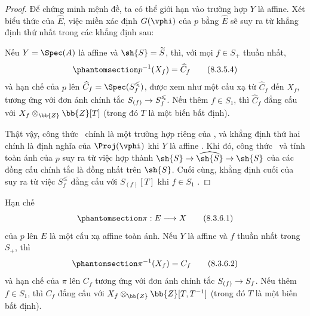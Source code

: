 \documentclass[oneside,10pt]{amsart}
\makeatletter
\renewcommand{\leq}{\leqslant}
\newcommand{\ega@arrow}[2]{\mathchoice{#1}{#2}{#2}{#2}}
\renewcommand{\to}{\ega@arrow{\longrightarrow}{\rightarrow}}
\let\EGAOriginalLabel\label
\renewcommand{\label}[1]{\phantomsection\EGAOriginalLabel{#1}}
\makeatother
\begin{document}
\begin{proof}
Để chứng minh mệnh đề, ta có thể giới hạn vào trường hợp $Y$ là affine.
Xét biểu thức  của $\widehat{E}$, việc miền xác định $G(\vphi)$ của $p$ bằng $\widehat{E}$ sẽ suy ra từ khẳng định thứ nhất trong các khẳng định sau:
\begin{env}[8.3.5.3]
\label{II.8.3.5.3}
Nếu $Y=\Spec(A)$ là affine và $\sh{S}=\widetilde{S}$, thì, với mọi $f\in S_+$ thuần nhất,
\[
\label{II.8.3.5.4}
  p^{-1}(X_f) = \widehat{C}_f
\tag{8.3.5.4}
\]
và hạn chế của $p$ lên $\widehat{C}_f=\Spec(S_f^\leq)$, được xem như một cấu xạ từ $\widehat{C}_f$ đến $X_f$, tương ứng với đơn ánh chính tắc $S_{(f)}\to S_f^\leq$.
Nếu thêm $f\in S_1$, thì $\widehat{C}_f$ đẳng cấu với $X_f\otimes_{\bb{Z}}\bb{Z}[T]$ (trong đó $T$ là một biến bất định).
\end{env}

Thật vậy, công thức~ chính là một trường hợp riêng của , và khẳng định thứ hai chính là định nghĩa của $\Proj(\vphi)$ khi $Y$ là affine .
Khi đó, công thức~ và tính toàn ánh của $p$ suy ra từ việc hợp thành $\sh{S}\to\widehat{\sh{S}}\to\sh{S}$ của các đồng cấu chính tắc là đồng nhất trên $\sh{S}$.
Cuối cùng, khẳng định cuối của  suy ra từ việc $S_f^\leq$ đẳng cấu với $S_{(f)}[T]$ khi $f\in S_1$ .
\end{proof}
\begin{corollary}[8.3.6]
\label{II.8.3.6}
Hạn chế
\[
\label{II.8.3.6.1}
  \pi: E \to X
\tag{8.3.6.1}
\]
của $p$ lên $E$ là một cấu xạ affine toàn ánh.
Nếu $Y$ là affine và $f$ thuần nhất trong $S_+$, thì
\[
\label{II.8.3.6.2}
  \pi^{-1}(X_f) = C_f
\tag{8.3.6.2}
\]
và hạn chế của $\pi$ lên $C_f$ tương ứng với đơn ánh chính tắc $S_{(f)}\to S_f$.
Nếu thêm $f\in S_1$, thì $C_f$ đẳng cấu với $X_f\otimes_{\bb{Z}}\bb{Z}[T,T^{-1}]$ (trong đó $T$ là một biến bất định).
\end{corollary}
\end{document}
